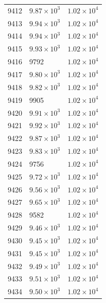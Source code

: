 \begin{table}[H]
\begin{tabular}{lll}
9412 & $\displaystyle 9.87 \times 10^{3}$ & $\displaystyle 1.02 \times 10^{4}$ \\
9413 & $\displaystyle 9.94 \times 10^{3}$ & $\displaystyle 1.02 \times 10^{4}$ \\
9414 & $\displaystyle 9.94 \times 10^{3}$ & $\displaystyle 1.02 \times 10^{4}$ \\
9415 & $\displaystyle 9.93 \times 10^{3}$ & $\displaystyle 1.02 \times 10^{4}$ \\
9416 & 9792 & $\displaystyle 1.02 \times 10^{4}$ \\
9417 & $\displaystyle 9.80 \times 10^{3}$ & $\displaystyle 1.02 \times 10^{4}$ \\
9418 & $\displaystyle 9.82 \times 10^{3}$ & $\displaystyle 1.02 \times 10^{4}$ \\
9419 & 9905 & $\displaystyle 1.02 \times 10^{4}$ \\
9420 & $\displaystyle 9.91 \times 10^{3}$ & $\displaystyle 1.02 \times 10^{4}$ \\
9421 & $\displaystyle 9.92 \times 10^{3}$ & $\displaystyle 1.02 \times 10^{4}$ \\
9422 & $\displaystyle 9.87 \times 10^{3}$ & $\displaystyle 1.02 \times 10^{4}$ \\
9423 & $\displaystyle 9.83 \times 10^{3}$ & $\displaystyle 1.02 \times 10^{4}$ \\
9424 & 9756 & $\displaystyle 1.02 \times 10^{4}$ \\
9425 & $\displaystyle 9.72 \times 10^{3}$ & $\displaystyle 1.02 \times 10^{4}$ \\
9426 & $\displaystyle 9.56 \times 10^{3}$ & $\displaystyle 1.02 \times 10^{4}$ \\
9427 & $\displaystyle 9.65 \times 10^{3}$ & $\displaystyle 1.02 \times 10^{4}$ \\
9428 & 9582 & $\displaystyle 1.02 \times 10^{4}$ \\
9429 & $\displaystyle 9.46 \times 10^{3}$ & $\displaystyle 1.02 \times 10^{4}$ \\
9430 & $\displaystyle 9.45 \times 10^{3}$ & $\displaystyle 1.02 \times 10^{4}$ \\
9431 & $\displaystyle 9.45 \times 10^{3}$ & $\displaystyle 1.02 \times 10^{4}$ \\
9432 & $\displaystyle 9.49 \times 10^{3}$ & $\displaystyle 1.02 \times 10^{4}$ \\
9433 & $\displaystyle 9.51 \times 10^{3}$ & $\displaystyle 1.02 \times 10^{4}$ \\
9434 & $\displaystyle 9.50 \times 10^{3}$ & $\displaystyle 1.02 \times 10^{4}$ \\

\end{tabular}
\end{table}
